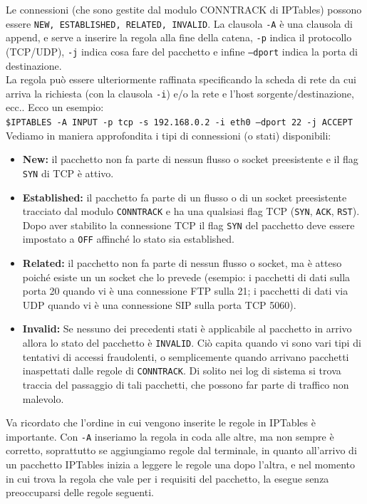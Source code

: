 \documentclass[a4paper]{report}
\newcommand\tab[1][1cm]{\hspace*{#1}}
\begin{document}
Le connessioni (che sono gestite dal modulo CONNTRACK di IPTables) possono essere \texttt{NEW, ESTABLISHED, RELATED, INVALID}. La clausola \texttt{-A} è una clausola di append, e serve a inserire la regola alla fine della catena, \texttt{-p} indica il protocollo (TCP/UDP), \texttt{-j} indica cosa fare del pacchetto e infine \texttt{--dport} indica la porta di destinazione.\\
La regola può essere ulteriormente raffinata specificando la scheda di rete da cui arriva la richiesta (con la clausola \texttt{-i}) e/o la rete e l'host sorgente/destinazione, ecc.. Ecco un esempio:\\
\tab\texttt{\$IPTABLES -A INPUT -p tcp -s 192.168.0.2 -i eth0 --dport 22 -j ACCEPT}\\
Vediamo in maniera approfondita i tipi di connessioni (o stati) disponibili:
\begin{itemize}
\item \textbf{New:} il pacchetto non fa parte di nessun flusso o socket preesistente e il flag \texttt{SYN} di TCP è attivo.
\item \textbf{Established:} il pacchetto fa parte di un flusso o di un socket preesistente tracciato dal modulo \texttt{CONNTRACK} e ha una qualsiasi flag TCP (\texttt{SYN}, \texttt{ACK}, \texttt{RST}). Dopo aver stabilito la connessione TCP il flag \texttt{SYN} del pacchetto deve essere impostato a \texttt{OFF} affinché lo stato sia established.
\item \textbf{Related:} il pacchetto non fa parte di nessun flusso o socket, ma è atteso poiché esiste un un socket che lo prevede (esempio: i pacchetti di dati sulla porta 20 quando vi è una connessione FTP sulla 21; i pacchetti di dati via UDP quando vi è una connessione SIP sulla porta TCP 5060).
\item \textbf{Invalid:} Se nessuno dei precedenti stati è applicabile al pacchetto in
arrivo allora lo stato del pacchetto è \texttt{INVALID}. Ciò capita quando vi sono
vari tipi di tentativi di accessi fraudolenti, o semplicemente quando
arrivano pacchetti inaspettati dalle regole di \texttt{CONNTRACK}. Di solito nei
log di sistema si trova traccia del passaggio di tali pacchetti, che possono far parte di traffico non malevolo.
\end{itemize}
Va ricordato che l'ordine in cui vengono inserite le regole in IPTables è importante. Con \texttt{-A} inseriamo la regola in coda alle altre, ma non sempre è corretto, soprattutto se aggiungiamo regole dal terminale, in quanto all'arrivo di un pacchetto IPTables inizia a leggere le regole una dopo l'altra, e nel momento in cui trova la regola che vale per i requisiti del pacchetto, la esegue senza preoccuparsi delle regole seguenti.\\
\end{document}
